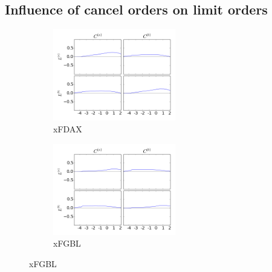 \documentclass[a4paper,11pt]{article}
\begin{document}
\subsection{Influence of cancel orders on limit orders}
\label{CL}
\begin{figure}[H]
        \begin{subfigure}[b]{0.45\textwidth}
                \includegraphics[width=\textwidth,height=40mm]{xFDAXPA_PB_TA_TB_LA_LB_CA_CB__CACB-_LALBcausality.png}
                \caption{xFDAX}
        \end{subfigure}
        \begin{subfigure}[b]{0.45\textwidth}
                \includegraphics[width=\textwidth,height=40mm]{xFGBLPA_PB_TA_TB_LA_LB_CA_CB__CACB-_LALBcausality.png}
                \caption{xFGBL}
        \end{subfigure}
\end{figure}






\end{document}
